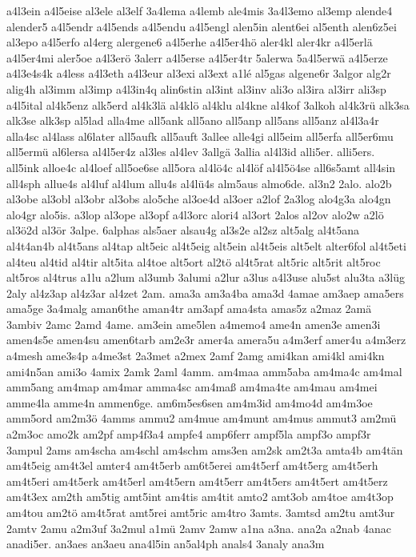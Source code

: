{a4l3ein
a4l5eise
al3ele
al3elf
3a4lema
a4lemb
ale4mis
3a4l3emo
al3emp
alende4
alender5
a4l5endr
a4l5ends
a4l5endu
a4l5engl
alen5in
alent6ei
al5enth
alen6z5ei
al3epo
a4l5erfo
al4erg
alergene6
a4l5erhe
a4l5er4hö
aler4kl
aler4kr
a4l5erlä
a4l5er4mi
aler5oe
a4l3erö
3alerr
a4l5erse
a4l5er4tr
5alerwa
5a4l5erwä
a4l5erze
a4l3e4s4k
a4less
a4l3eth
a4l3eur
al3exi
al3ext
a1lé
al5gas
algene6r
3algor
alg2r
alig4h
al3imm
al3imp
a4l3in4q
alin6stin
al3int
al3inv
ali3o
al3ira
al3irr
ali3sp
a4l5ital
al4k5enz
alk5erd
al4k3lä
al4klö
al4klu
al4kne
al4kof
3alkoh
al4k3rü
alk3sa
alk3se
alk3sp
al5lad
alla4me
all5ank
all5ano
all5anp
all5ans
all5anz
al4l3a4r
alla4sc
al4lass
al6later
all5aufk
all5auft
3allee
alle4gi
all5eim
all5erfa
all5er6mu
all5ermü
al6lersa
al4l5er4z
al3les
al4lev
3allgä
3allia
al4l3id
alli5er.
alli5ers.
all5ink
alloe4c
al4loef
all5oe6se
all5ora
al4lö4c
al4löf
al4l5ö4se
all6s5amt
all4sin
all4sph
allue4s
al4luf
al4lum
allu4s
al4lü4s
alm5aus
almo6de.
al3n2
2alo.
alo2b
al3obe
al3obl
al3obr
al3obs
alo5che
al3oe4d
al3oer
a2lof
2a3log
alo4g3a
alo4gn
alo4gr
alo5is.
a3lop
al3ope
al3opf
a4l3orc
alori4
al3ort
2alos
al2ov
alo2w
a2lö
al3ö2d
al3ör
3alpe.
6alphas
als5aer
alsau4g
al3s2e
al2sz
alt5alg
al4t5ana
al4t4an4b
al4t5ans
al4tap
alt5eic
al4t5eig
alt5ein
al4t5eis
alt5elt
alter6fol
al4t5eti
al4teu
al4tid
al4tir
alt5ita
al4toe
alt5ort
al2tö
al4t5rat
alt5ric
alt5rit
alt5roc
alt5ros
al4trus
a1lu
a2lum
al3umb
3alumi
a2lur
a3lus
a4l3use
alu5st
alu3ta
a3lüg
2aly
al4z3ap
al4z3ar
al4zet
2am.
ama3a
am3a4ba
ama3d
4amae
am3aep
ama5ers
ama5ge
3a4malg
aman6the
aman4tr
am3apf
ama4sta
amas5z
a2maz
2amä
3ambiv
2amc
2amd
4ame.
am3ein
ame5len
a4memo4
ame4n
amen3e
amen3i
amen4s5e
amen4su
amen6tarb
am2e3r
amer4a
amera5u
a4m3erf
amer4u
a4m3erz
a4mesh
ame3s4p
a4me3st
2a3met
a2mex
2amf
2amg
ami4kan
ami4kl
ami4kn
ami4n5an
ami3o
4amix
2amk
2aml
4amm.
am4maa
amm5aba
am4ma4c
am4mal
amm5ang
am4map
am4mar
amma4sc
am4maß
am4ma4te
am4mau
am4mei
amme4la
amme4n
ammen6ge.
am6m5es6sen
am4m3id
am4mo4d
am4m3oe
amm5ord
am2m3ö
4amms
ammu2
am4mue
am4munt
am4mus
ammut3
am2mü
a2m3oc
amo2k
am2pf
amp4f3a4
ampfe4
amp6ferr
ampf5la
ampf3o
ampf3r
3ampul
2ams
am4scha
am4schl
am4schm
ams3en
am2sk
am2t3a
amta4b
am4tän
am4t5eig
am4t3el
amter4
am4t5erb
am6t5erei
am4t5erf
am4t5erg
am4t5erh
am4t5eri
am4t5erk
am4t5erl
am4t5ern
am4t5err
am4t5ers
am4t5ert
am4t5erz
am4t3ex
am2th
am5tig
amt5int
am4tis
am4tit
amto2
amt3ob
am4toe
am4t3op
am4tou
am2tö
am4t5rat
amt5rei
amt5ric
am4tro
3amts.
3amtsd
am2tu
amt3ur
2amtv
2amu
a2m3uf
3a2mul
a1mü
2amv
2amw
a1na
a3na.
ana2a
a2nab
4anac
anadi5er.
an3aes
an3aeu
ana4l5in
an5al4ph
anals4
3analy
ana3m
}
